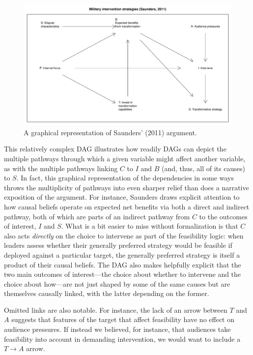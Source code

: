 \documentclass[
  12pt,
]{book}
\begin{document}
\begin{figure}

{\centering \includegraphics[width=.7\textwidth]{ii_files/figure-latex/saunders-1} 

}

\caption{\label{fig:DAGSaunders} A graphical representation of Saunders' (2011) argument.}\label{fig:saunders}
\end{figure}

This relatively complex DAG illustrates how readily DAGs can depict the multiple pathways through which a given variable might affect another variable, as with the multiple pathways linking \(C\) to \(I\) and \(B\) (and, thus, all of its causes) to \(S\). In fact, this graphical representation of the dependencies in some ways throws the multiplicity of pathways into even sharper relief than does a narrative exposition of the argument. For instance, Saunders draws explicit attention to how causal beliefs operate on expected net benefits via both a direct and indirect pathway, both of which are parts of an indirect pathway from \(C\) to the outcomes of interest, \(I\) and \(S\). What is a bit easier to miss without formalization is that \(C\) also acts \emph{directly} on the choice to intervene as part of the feasibility logic: when leaders assess whether their generally preferred strategy would be feasible if deployed against a particular target, the generally preferred strategy is itself a product of their causal beliefs. The DAG also makes helpfully explicit that the two main outcomes of interest---the choice about whether to intervene and the choice about how---are not just shaped by some of the same causes but are themselves causally linked, with the latter depending on the former.

Omitted links are also notable. For instance, the lack of an arrow between \(T\) and \(A\) suggests that features of the target that affect feasibility have no effect on audience pressures. If instead we believed, for instance, that audiences take feasibility into account in demanding intervention, we would want to include a \(T \rightarrow A\) arrow.
\end{document}
